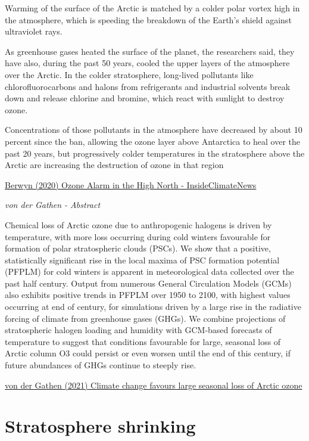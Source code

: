 \documentclass[
]{book}
\begin{document}
Warming of the surface of the Arctic is matched by a colder polar vortex high in the atmosphere, which is speeding the breakdown of the Earth's shield against ultraviolet rays.

As greenhouse gases heated the surface of the planet, the researchers said, they have also, during the past 50 years, cooled the upper layers of the atmosphere over the Arctic. In the colder stratosphere, long-lived pollutants like chlorofluorocarbons and halons from refrigerants and industrial solvents break down and release chlorine and bromine, which react with sunlight to destroy ozone.

Concentrations of those pollutants in the atmosphere have decreased by about 10 percent since the ban, allowing the ozone layer above Antarctica to heal over the past 20 years, but progressively colder temperatures in the stratosphere above the Arctic are increasing the destruction of ozone in that region

\href{https://insideclimatenews.org/news/23062021/climate-research-mosaic-arctic-ozone/}{Berwyn (2020) Ozone Alarm in the High North - InsideClimateNews}

\emph{von der Gathen - Abstract}

Chemical loss of Arctic ozone due to anthropogenic halogens is driven by temperature, with more loss occurring during cold winters favourable for formation of polar stratospheric clouds (PSCs). We show that a positive, statistically significant rise in the local maxima of PSC formation potential (PFPLM) for cold winters is apparent in meteorological data collected over the past half century. Output from numerous General Circulation Models (GCMs) also exhibits positive trends in PFPLM over 1950 to 2100, with highest values occurring at end of century, for simulations driven by a large rise in the radiative forcing of climate from greenhouse gases (GHGs). We combine projections of stratospheric halogen loading and humidity with GCM-based forecasts of temperature to suggest that conditions favourable for large, seasonal loss of Arctic column O3 could persist or even worsen until the end of this century, if future abundances of GHGs continue to steeply rise.

\href{https://www.nature.com/articles/s41467-021-24089-6}{von der Gathen (2021) Climate change favours large seasonal loss of Arctic ozone}

\hypertarget{stratosphere-shrinking}{%
\section{Stratosphere shrinking}\label{stratosphere-shrinking}}
\end{document}
